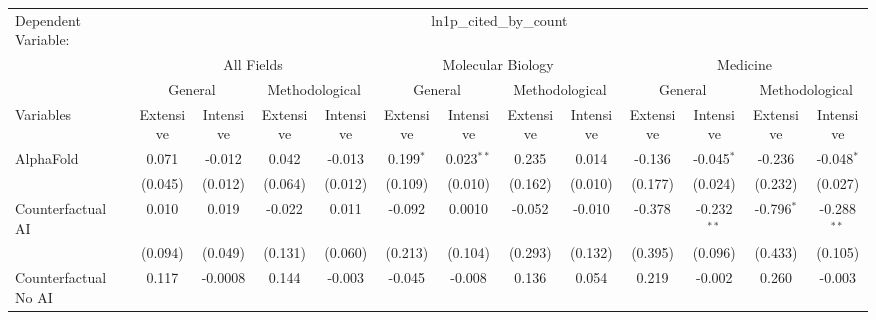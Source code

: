 \begingroup
\centering
\begin{tabular}{lcccccccccccc}
   \tabularnewline \midrule \midrule
   Dependent Variable: & \multicolumn{12}{c}{ln1p\_cited\_by\_count}\\
 & \multicolumn{4}{c}{All Fields} & \multicolumn{4}{c}{Molecular Biology} & \multicolumn{4}{c}{Medicine} \\
\cmidrule(lr){2-5} \cmidrule(lr){6-9} \cmidrule(lr){10-13}
 & \multicolumn{2}{c}{General} & \multicolumn{2}{c}{Methodological} & \multicolumn{2}{c}{General} & \multicolumn{2}{c}{Methodological} & \multicolumn{2}{c}{General} & \multicolumn{2}{c}{Methodological} \\
\cmidrule(lr){2-3} \cmidrule(lr){4-5} \cmidrule(lr){6-7} \cmidrule(lr){8-9} \cmidrule(lr){10-11} \cmidrule(lr){12-13}
Variables & \multicolumn{1}{c}{Extensive} & \multicolumn{1}{c}{Intensive} & \multicolumn{1}{c}{Extensive} & \multicolumn{1}{c}{Intensive} & \multicolumn{1}{c}{Extensive} & \multicolumn{1}{c}{Intensive} & \multicolumn{1}{c}{Extensive} & \multicolumn{1}{c}{Intensive} & \multicolumn{1}{c}{Extensive} & \multicolumn{1}{c}{Intensive} & \multicolumn{1}{c}{Extensive} & \multicolumn{1}{c}{Intensive} \\
\cmidrule(lr){1-1}\cmidrule(lr){2-2} \cmidrule(lr){3-3} \cmidrule(lr){4-4} \cmidrule(lr){5-5} \cmidrule(lr){6-6} \cmidrule(lr){7-7} \cmidrule(lr){8-8} \cmidrule(lr){9-9} \cmidrule(lr){10-10} \cmidrule(lr){11-11} \cmidrule(lr){12-12} \cmidrule(lr){13-13}
   AlphaFold                                & 0.071          & -0.012   & 0.042         & -0.013   & 0.199$^{*}$ & 0.023$^{**}$ & 0.235   & 0.014   & -0.136  & -0.045$^{*}$  & -0.236       & -0.048$^{*}$\\   
                                            & (0.045)        & (0.012)  & (0.064)       & (0.012)  & (0.109)     & (0.010)      & (0.162) & (0.010) & (0.177) & (0.024)       & (0.232)      & (0.027)\\   
   Counterfactual AI                        & 0.010          & 0.019    & -0.022        & 0.011    & -0.092      & 0.0010       & -0.052  & -0.010  & -0.378  & -0.232$^{**}$ & -0.796$^{*}$ & -0.288$^{**}$\\   
                                            & (0.094)        & (0.049)  & (0.131)       & (0.060)  & (0.213)     & (0.104)      & (0.293) & (0.132) & (0.395) & (0.096)       & (0.433)      & (0.105)\\   
   Counterfactual No AI                     & 0.117          & -0.0008  & 0.144         & -0.003   & -0.045      & -0.008       & 0.136   & 0.054   & 0.219   & -0.002        & 0.260        & -0.003\\   

\end{tabular}
